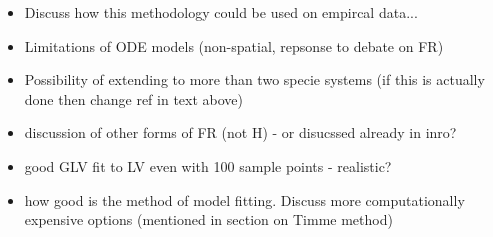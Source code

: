 \begin{itemize}
	\item Discuss how this methodology could be used on empircal data...
	\item Limitations of ODE models (non-spatial, repsonse to debate on FR)
	\item Possibility of extending to more than two specie systems (if this is actually done then change ref in text above)
	\item discussion of other forms of FR (not H) - or disucssed already in inro?
	
	\item good GLV fit to LV even with 100 sample points - realistic?
	
	\item how good is the method of model fitting. Discuss more computationally expensive options (mentioned in section on Timme method)
\end{itemize}
